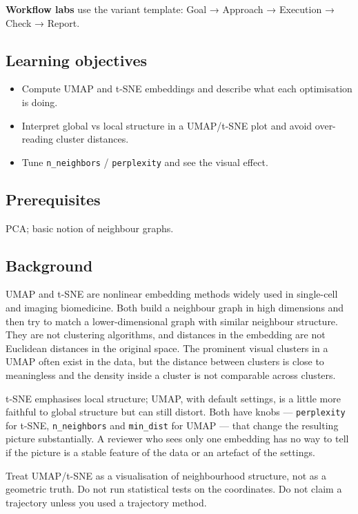 \documentclass[
]{article}
\author{}
\date{\vspace{-2.5em}}
\providecommand{\tightlist}{%
  \setlength{\itemsep}{0pt}\setlength{\parskip}{0pt}}
\begin{document}
\textbf{Workflow labs} use the variant template: Goal → Approach →
Execution → Check → Report.

\subsection{Learning objectives}\label{learning-objectives}

\begin{itemize}
\tightlist
\item
  Compute UMAP and t-SNE embeddings and describe what each optimisation
  is doing.
\item
  Interpret global vs local structure in a UMAP/t-SNE plot and avoid
  over-reading cluster distances.
\item
  Tune \texttt{n\_neighbors} / \texttt{perplexity} and see the visual
  effect.
\end{itemize}

\subsection{Prerequisites}\label{prerequisites}

PCA; basic notion of neighbour graphs.

\subsection{Background}\label{background}

UMAP and t-SNE are nonlinear embedding methods widely used in
single-cell and imaging biomedicine. Both build a neighbour graph in
high dimensions and then try to match a lower-dimensional graph with
similar neighbour structure. They are not clustering algorithms, and
distances in the embedding are not Euclidean distances in the original
space. The prominent visual clusters in a UMAP often exist in the data,
but the distance between clusters is close to meaningless and the
density inside a cluster is not comparable across clusters.

t-SNE emphasises local structure; UMAP, with default settings, is a
little more faithful to global structure but can still distort. Both
have knobs --- \texttt{perplexity} for t-SNE, \texttt{n\_neighbors} and
\texttt{min\_dist} for UMAP --- that change the resulting picture
substantially. A reviewer who sees only one embedding has no way to tell
if the picture is a stable feature of the data or an artefact of the
settings.

Treat UMAP/t-SNE as a visualisation of neighbourhood structure, not as a
geometric truth. Do not run statistical tests on the coordinates. Do not
claim a trajectory unless you used a trajectory method.
\end{document}
